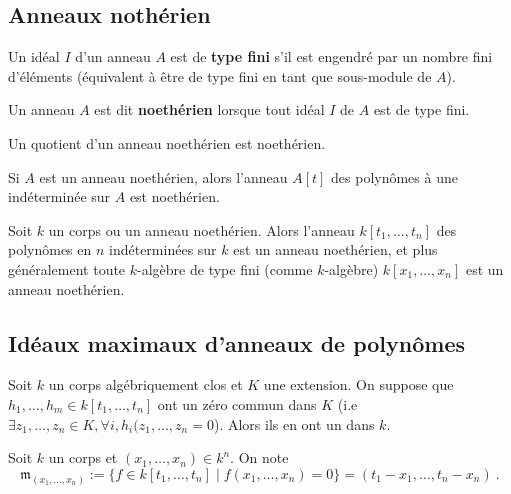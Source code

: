 \subsection{Anneaux nothérien}

	\begin{defn}
		Un idéal $I$ d'un anneau $A$ est de \textbf{type fini} s'il est engendré par un nombre fini d'éléments (équivalent à être de type fini en tant que sous-module de $A$).
	\end{defn}

	\begin{defn}
		Un anneau $A$ est dit \textbf{noethérien} lorsque tout idéal $I$ de $A$ est de type fini.
	\end{defn}

	\begin{rem}
		Un quotient d’un anneau noethérien est noethérien.
	\end{rem}

	\begin{thm}
		Si $A$ est un anneau noethérien, alors l’anneau $A[t]$ des polynômes à une indéterminée sur $A$ est noethérien.
	\end{thm}

	\begin{cor}
		Soit $k$ un corps ou un anneau noethérien.
		Alors l’anneau $k[t_1,\ldots,t_n]$ des polynômes en $n$ indéterminées sur $k$ est un anneau noethérien, et plus généralement toute $k$-algèbre de type fini (comme $k$-algèbre) $k[x_1,\ldots,x_n]$ est un anneau noethérien.
	\end{cor}

\subsection{Idéaux maximaux d’anneaux de polynômes}

	\begin{lem}
		Soit $k$ un corps algébriquement clos et $K$ une extension.
		On suppose que $h_1,\ldots,h_m \in k[t_1,\ldots,t_n]$ ont un zéro commun dans $K$ (i.e $\exists z_1,\ldots,z_n \in K, \forall i, h_i(z_1,\ldots,z_n = 0$).
		Alors ils en ont un dans $k$.
	\end{lem}

	\begin{note}
		Soit $k$ un corps et $(x_1,\ldots,x_n) \in k^n$. On note
		$$\mathfrak{m}_{(x_1,\ldots,x_n)} := \{ f \in k[t_1,\ldots,t_n] \mid f(x_1,\ldots,x_n) = 0 \} = (t_1 - x_1,\ldots,t_n - x_n)\ .$$
	\end{note}


